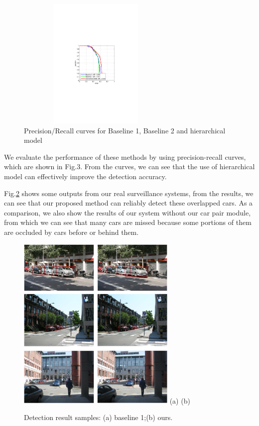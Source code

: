 \documentclass[times, 10pt,twocolumn]{article}
\begin{document}
\begin{figure}
\centering
\includegraphics[width=3in, height =2.5in]{./figs/pr_comp.pdf}
\caption{Precision/Recall curves for Baseline 1, Baseline 2 and hierarchical model}
\label{fig::PRCurve}
\end{figure}
 


We evaluate the performance of these methods by using precision-recall curves, which are shown in Fig.3. From the curves, we can see that the use of hierarchical model can effectively improve the detection accuracy.

Fig.\ref{fig::sample} shows some outputs from our real surveillance systems, from the results, we can see that our proposed method can reliably detect these overlapped cars. As a comparison, we also show the results of our system without our car pair module, from which we can see that many cars are missed because some portions of them are occluded by cars before or behind them.


\begin{figure}
\centering
\includegraphics[width = 3in]{./figs/fig3.png}
(a) \hspace{1.2in}(b)
\caption{Detection result samples: (a) baseline 1;(b) ours.}
\label{fig::sample}
\end{figure}


\nocite{ex1,ex2}


\end{document}
